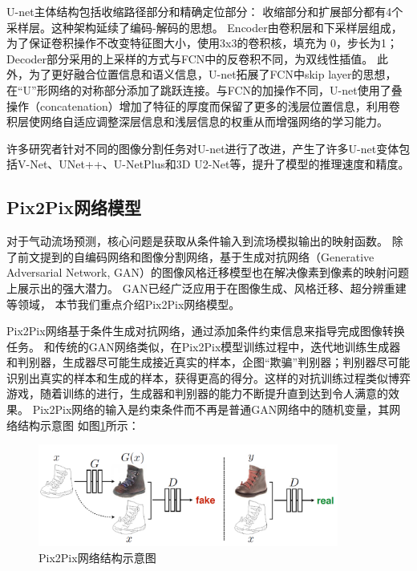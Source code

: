 U-net主体结构包括收缩路径部分和精确定位部分：
收缩部分和扩展部分都有4个采样层。这种架构延续了编码-解码的思想。
Encoder由卷积层和下采样层组成，为了保证卷积操作不改变特征图大小，使用3x3的卷积核，填充为 0，步长为1；Decoder部分采用的上采样的方式与FCN中的反卷积不同，为双线性插值。
此外，为了更好融合位置信息和语义信息，U-net拓展了FCN中skip layer的思想，在“U”形网络的对称部分添加了跳跃连接。与FCN的加操作不同，U-net使用了叠操作（concatenation）增加了特征的厚度而保留了更多的浅层位置信息，利用卷积层使网络自适应调整深层信息和浅层信息的权重从而增强网络的学习能力。

许多研究者针对不同的图像分割任务对U-net进行了改进，产生了许多U-net变体包括V-Net\cite{2016V}、UNet++\cite{unet++}、U-NetPlus\cite{unetplus}和3D U2-Net\cite{20193D}等，提升了模型的推理速度和精度。


\subsection{Pix2Pix网络模型}
对于气动流场预测，核心问题是获取从条件输入到流场模拟输出的映射函数。
除了前文提到的自编码网络和图像分割网络，基于生成对抗网络（Generative Adversarial Network, GAN）的图像风格迁移模型也在解决像素到像素的映射问题上展示出的强大潜力。
GAN已经广泛应用于在图像生成、风格迁移、超分辨重建等领域，
本节我们重点介绍Pix2Pix网络模型\cite{isola2017image}。

Pix2Pix网络基于条件生成对抗网络\cite{cGAN}，通过添加条件约束信息来指导完成图像转换任务。
和传统的GAN网络类似，在Pix2Pix模型训练过程中，迭代地训练生成器和判别器，生成器尽可能生成接近真实的样本，企图“欺骗”判别器；判别器尽可能识别出真实的样本和生成的样本，获得更高的得分。这样的对抗训练过程类似博弈游戏，随着训练的进行，生成器和判别器的能力不断提升直到达到令人满意的效果。
Pix2Pix网络的输入是约束条件而不再是普通GAN网络中的随机变量，其网络结构示意图
如图\ref{fig:cgan}所示：

\begin{figure}[htp]
	\centering
	\includegraphics[width=0.88\textwidth]{figures/cGAN.png}
	\caption{Pix2Pix网络结构示意图}
	\label{fig:cgan}
\end{figure}

